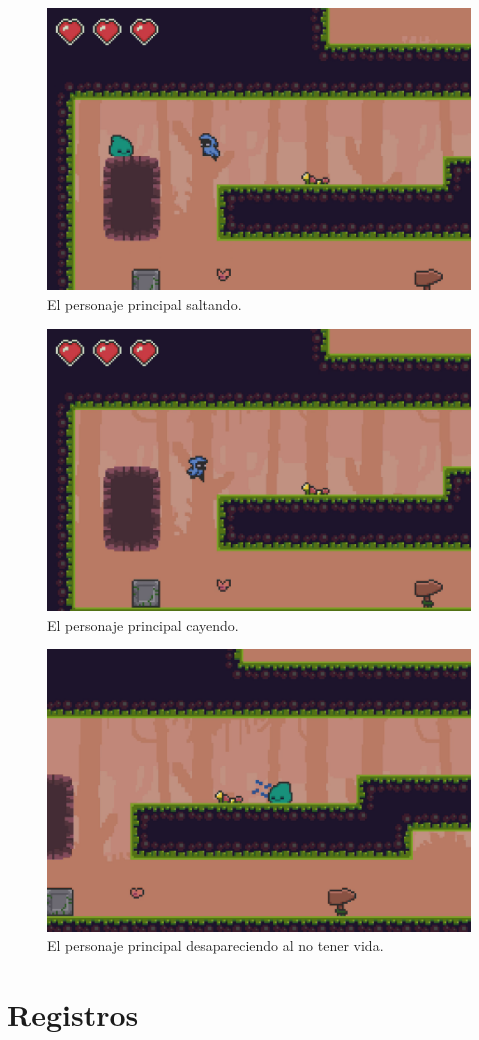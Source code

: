 \begin{figure}[h]
	\centering
	\includegraphics[width=.6\textwidth]{capitulos/apendice/sprites_8.png}
	\caption{El personaje principal saltando.}\label{fig:ap_sprites_8}
\end{figure}

\begin{figure}[h]
	\centering
	\includegraphics[width=.6\textwidth]{capitulos/apendice/sprites_9.png}
	\caption{El personaje principal cayendo.}\label{fig:ap_sprites_9}
\end{figure}

\begin{figure}[h]
	\centering
	\includegraphics[width=.6\textwidth]{capitulos/apendice/sprites_10.png}
	\caption{El personaje principal desapareciendo al no tener vida.}\label{fig:ap_sprites_10}
\end{figure}
\FloatBarrier{}


\section{Registros}\label{ap:registros}

